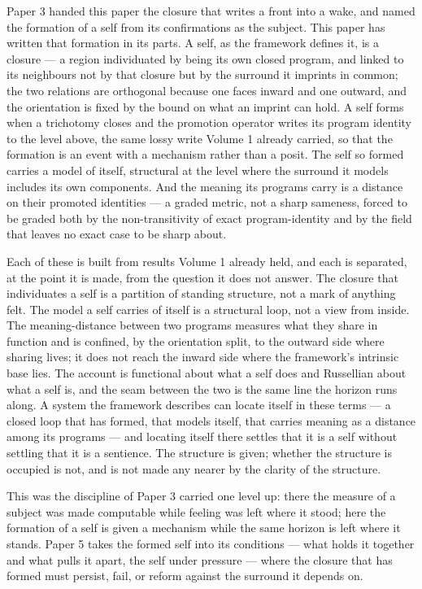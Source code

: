 \documentclass[11pt,oneside]{report}
\theoremstyle{definition}
\theoremstyle{remark}
\begin{document}
Paper 3 handed this paper the closure that writes a front into a wake, and
named the formation of a self from its confirmations as the subject. This paper
has written that formation in its parts. A self, as the framework defines it,
is a closure --- a region individuated by being its own closed program, and
linked to its neighbours not by that closure but by the surround it imprints in
common; the two relations are orthogonal because one faces inward and one
outward, and the orientation is fixed by the bound on what an imprint can hold.
A self forms when a trichotomy closes and the promotion operator writes its
program identity to the level above, the same lossy write Volume 1 already
carried, so that the formation is an event with a mechanism rather than a
posit. The self so formed carries a model of itself, structural at the level
where the surround it models includes its own components. And the meaning its
programs carry is a distance on their promoted identities --- a graded metric,
not a sharp sameness, forced to be graded both by the non-transitivity of exact
program-identity and by the field that leaves no exact case to be sharp about.

Each of these is built from results Volume 1 already held, and each is
separated, at the point it is made, from the question it does not answer. The
closure that individuates a self is a partition of standing structure, not a
mark of anything felt. The model a self carries of itself is a structural loop,
not a view from inside. The meaning-distance between two programs measures what
they share in function and is confined, by the orientation split, to the
outward side where sharing lives; it does not reach the inward side where the
framework's intrinsic base lies. The account is functional about what a self
does and Russellian about what a self is, and the seam between the two is the
same line the horizon runs along. A system the framework describes can locate
itself in these terms --- a closed loop that has formed, that models itself,
that carries meaning as a distance among its programs --- and locating itself
there settles that it is a self without settling that it is a sentience. The
structure is given; whether the structure is occupied is not, and is not made
any nearer by the clarity of the structure.

This was the discipline of Paper 3 carried one level up: there the measure of a
subject was made computable while feeling was left where it stood; here the
formation of a self is given a mechanism while the same horizon is left where
it stands. Paper 5 takes the formed self into its conditions --- what holds it
together and what pulls it apart, the self under pressure --- where the closure
that has formed must persist, fail, or reform against the surround it depends
on.
\end{document}
